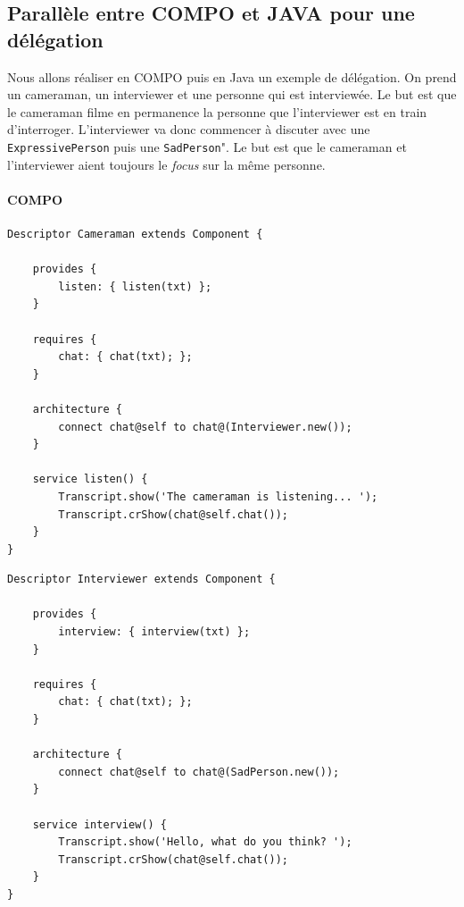 \documentclass[11pt,a4paper,openany,oneside]{book}
\begin{document}
\begin{appendices}
\appendixpage
\noappendicestocpagenum
\addappheadtotoc

\chapter{Parallèle entre COMPO et JAVA pour une délégation}


\label{Annexe A}

Nous allons réaliser en COMPO puis en Java un exemple de délégation. On prend un cameraman, un interviewer et une personne qui est interviewée. Le but est que le cameraman filme en permanence la personne que l'interviewer est en train d'interroger. L'interviewer va donc commencer à discuter avec une \texttt{ExpressivePerson} puis une \texttt{SadPerson}". Le but est que le cameraman et l'interviewer aient toujours le \textit{focus} sur la même personne.

\subsubsection{COMPO}
\begin{lstlisting}[language=Compo, frame=single, caption=Cameraman]
Descriptor Cameraman extends Component {

    provides {
        listen: { listen(txt) };
    }
    
    requires {
        chat: { chat(txt); };
    }
    
    architecture {
        connect chat@self to chat@(Interviewer.new());
    }
    
    service listen() {
        Transcript.show('The cameraman is listening... ');
        Transcript.crShow(chat@self.chat());
    }
}
\end{lstlisting}

\newpage

\begin{lstlisting}[language=Compo, frame=single, caption=Interviewer]
Descriptor Interviewer extends Component {

    provides {
        interview: { interview(txt) };
    }
    
    requires {
        chat: { chat(txt); };
    }
    
    architecture {
        connect chat@self to chat@(SadPerson.new());
    }
    
    service interview() {
        Transcript.show('Hello, what do you think? ');
        Transcript.crShow(chat@self.chat());
    }
}
\end{lstlisting}


\end{appendices}
\end{document}

